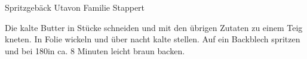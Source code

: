 \begin{recipe}{Spritzgebäck Uta}{von Familie Stappert}
  \inglist

  \steps
  Die kalte Butter in Stücke schneiden und mit den übrigen Zutaten zu einem
  Teig kneten. In Folie wickeln und über nacht kalte stellen. Auf ein Backblech
  spritzen und bei 180\celsius in ca. 8 Minuten leicht braun backen.
\end{recipe}
